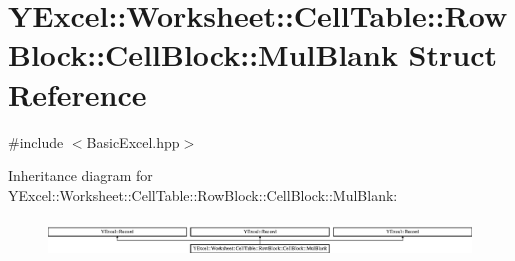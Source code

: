 \hypertarget{struct_y_excel_1_1_worksheet_1_1_cell_table_1_1_row_block_1_1_cell_block_1_1_mul_blank}{}\section{Y\+Excel\+:\+:Worksheet\+:\+:Cell\+Table\+:\+:Row\+Block\+:\+:Cell\+Block\+:\+:Mul\+Blank Struct Reference}
\label{struct_y_excel_1_1_worksheet_1_1_cell_table_1_1_row_block_1_1_cell_block_1_1_mul_blank}


{\ttfamily \#include $<$Basic\+Excel.\+hpp$>$}

Inheritance diagram for Y\+Excel\+:\+:Worksheet\+:\+:Cell\+Table\+:\+:Row\+Block\+:\+:Cell\+Block\+:\+:Mul\+Blank\+:\begin{figure}[H]
\begin{center}
\leavevmode
\includegraphics[height=1.031308cm]{struct_y_excel_1_1_worksheet_1_1_cell_table_1_1_row_block_1_1_cell_block_1_1_mul_blank}
\end{center}
\end{figure}

